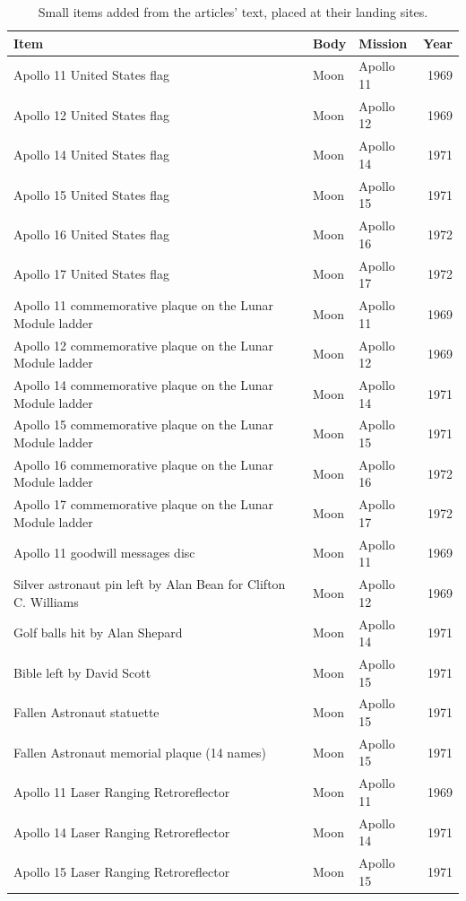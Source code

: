 \documentclass[11pt,a4paper]{article}
\begin{document}
\begin{footnotesize}\begin{longtable}{p{8.2cm}lp{3.4cm}r}\caption{Small items added from the articles' text, placed at their landing sites.}\label{tab:items}\\\toprule Item & Body & Mission & Year\\\midrule\endhead
Apollo 11 United States flag & Moon & Apollo 11 & 1969\\
Apollo 12 United States flag & Moon & Apollo 12 & 1969\\
Apollo 14 United States flag & Moon & Apollo 14 & 1971\\
Apollo 15 United States flag & Moon & Apollo 15 & 1971\\
Apollo 16 United States flag & Moon & Apollo 16 & 1972\\
Apollo 17 United States flag & Moon & Apollo 17 & 1972\\
Apollo 11 commemorative plaque on the Lunar Module ladder & Moon & Apollo 11 & 1969\\
Apollo 12 commemorative plaque on the Lunar Module ladder & Moon & Apollo 12 & 1969\\
Apollo 14 commemorative plaque on the Lunar Module ladder & Moon & Apollo 14 & 1971\\
Apollo 15 commemorative plaque on the Lunar Module ladder & Moon & Apollo 15 & 1971\\
Apollo 16 commemorative plaque on the Lunar Module ladder & Moon & Apollo 16 & 1972\\
Apollo 17 commemorative plaque on the Lunar Module ladder & Moon & Apollo 17 & 1972\\
Apollo 11 goodwill messages disc & Moon & Apollo 11 & 1969\\
Silver astronaut pin left by Alan Bean for Clifton C. Williams & Moon & Apollo 12 & 1969\\
Golf balls hit by Alan Shepard & Moon & Apollo 14 & 1971\\
Bible left by David Scott & Moon & Apollo 15 & 1971\\
Fallen Astronaut statuette & Moon & Apollo 15 & 1971\\
Fallen Astronaut memorial plaque (14 names) & Moon & Apollo 15 & 1971\\
Apollo 11 Laser Ranging Retroreflector & Moon & Apollo 11 & 1969\\
Apollo 14 Laser Ranging Retroreflector & Moon & Apollo 14 & 1971\\
Apollo 15 Laser Ranging Retroreflector & Moon & Apollo 15 & 1971\\

\end{longtable}
\end{footnotesize}
\end{document}

